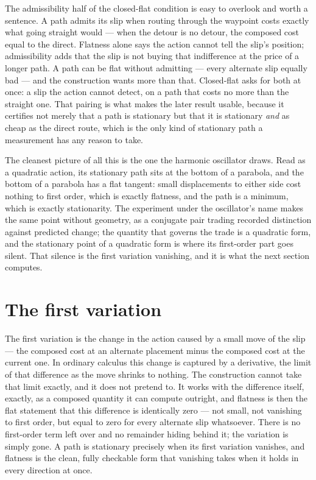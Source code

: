 The admissibility half of the closed-flat condition is easy to overlook and worth a sentence. A path
admits its slip when routing through the waypoint costs exactly what going straight would --- when the
detour is no detour, the composed cost equal to the direct. Flatness alone says the action cannot tell
the slip's position; admissibility adds that the slip is not buying that indifference at the price of a
longer path. A path can be flat without admitting --- every alternate slip equally bad --- and the
construction wants more than that. Closed-flat asks for both at once: a slip the action cannot detect,
on a path that costs no more than the straight one. That pairing is what makes the later result usable,
because it certifies not merely that a path is stationary but that it is stationary \emph{and} as cheap
as the direct route, which is the only kind of stationary path a measurement has any reason to take.

The cleanest picture of all this is the one the harmonic oscillator draws. Read as a quadratic action,
its stationary path sits at the bottom of a parabola, and the bottom of a parabola has a flat
tangent: small displacements to either side cost nothing to first order, which is exactly flatness, and
the path is a minimum, which is exactly stationarity. The experiment under the oscillator's name makes
the same point without geometry, as a conjugate pair trading recorded distinction against predicted
change; the quantity that governs the trade is a quadratic form, and the stationary point of a
quadratic form is where its first-order part goes silent. That silence is the first variation
vanishing, and it is what the next section computes.

\section{The first variation}
\label{se:the-first-variation}

The first variation is the change in the action caused by a small move of the slip --- the composed
cost at an alternate placement minus the composed cost at the current one. In ordinary calculus this
change is captured by a derivative, the limit of that difference as the move shrinks to nothing. The
construction cannot take that limit exactly, and it does not pretend to. It works with the difference
itself, exactly, as a composed quantity it can compute outright, and flatness is then the flat
statement that this difference is identically zero --- not small, not vanishing to first order, but
equal to zero for every alternate slip whatsoever. There is no first-order term left over and no
remainder hiding behind it; the variation is simply gone. A path is stationary precisely when its
first variation vanishes, and flatness is the clean, fully checkable form that vanishing takes when it
holds in every direction at once.

